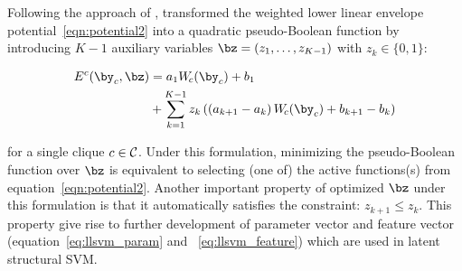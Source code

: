 \documentclass[sigconf]{acmart}
\renewcommand{\citename}{\citet}
\begin{document}
Following the approach of \citename{Kohli:CVPR10},
\citename{Gould:ICML2011,gouldlearning} transformed the weighted
lower linear envelope potential~\eqref{eqn:potential2} into a
quadratic pseudo-Boolean function by introducing $K-1$ auxiliary
variables $\bz = \left(z_1, \ldots, z_{K-1}\right)$ with $z_k\in
\{0,1\}$:

\begin{align}
  E^c(\by_c, \bz) &= a_1 W_{\!c}(\by_c) + b_1 \notag \\
  &+ \sum_{k = 1}^{K-1} z_k \left( \left(a_{k+1} - a_k\right) W_{\!c}(\by_c) + b_{k+1} - b_k \right)
  \label{eqn:binary_concave_z}
\end{align}

\noindent for a single clique $c \in \cal C$. Under this formulation,
minimizing the pseudo-Boolean function over $\bz$ is equivalent
to selecting (one of) the active functions(s) from
equation~\eqref{eqn:potential2}. Another important property of
optimized $\bz$ under this formulation is that it automatically
satisfies the constraint: $z_{k+1} \leq z_k$. This property give rise to further development of
parameter vector and feature
vector (equation~\eqref{eq:llsvm_param} and ~\eqref{eq:llsvm_feature})
which are used in latent
structural SVM.
\end{document}
